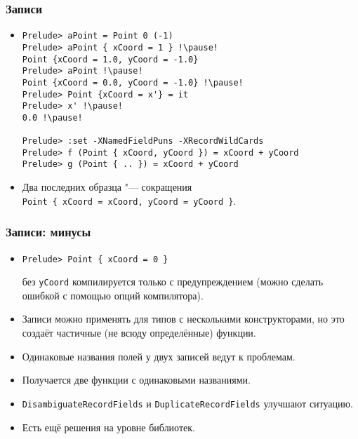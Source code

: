 \documentclass[10pt]{beamer}
\begin{document}
\begin{frame}[fragile]
\frametitle{Записи}\hypertarget{rec2}{}
\hyperlink{rec1}{}
\begin{itemize}
\item 
\begin{lstlisting}[basicstyle=\ttfamily\small]
Prelude> aPoint = Point 0 (-1)
Prelude> aPoint { xCoord = 1 } !\pause!
Point {xCoord = 1.0, yCoord = -1.0}
Prelude> aPoint !\pause!
Point {xCoord = 0.0, yCoord = -1.0} !\pause!
Prelude> Point {xCoord = x'} = it
Prelude> x' !\pause!
0.0 !\pause!

Prelude> :set -XNamedFieldPuns -XRecordWildCards
Prelude> f (Point { xCoord, yCoord }) = xCoord + yCoord
Prelude> g (Point { .. }) = xCoord + yCoord
\end{lstlisting}
\item Два последних образца "--- сокращения\\ \lstinline[basicstyle=\ttfamily\small]|Point { xCoord = xCoord, yCoord = yCoord }|.
\end{itemize}
\end{frame}

\begin{frame}[fragile]
\frametitle{Записи: минусы}\hypertarget{rec2}{}
\hyperlink{rec1}{}
\begin{itemize}
    \item
\begin{lstlisting}
Prelude> Point { xCoord = 0 }
\end{lstlisting}
    \pause
    без \lstinline|yCoord| компилируется только с предупреждением (можно сделать ошибкой с помощью опций компилятора).
    \pause 
    \item Записи можно применять для типов с несколькими конструкторами, но это создаёт частичные (не всюду определённые) функции.
    \pause
    \item Одинаковые названия полей у двух записей ведут к проблемам. 
    \pause
    \item Получается две функции с одинаковыми названиями.
    \item \lstinline|DisambiguateRecordFields| и \lstinline|DuplicateRecordFields| улучшают ситуацию.
    \pause
    \item Есть ещё решения на уровне библиотек.
\end{itemize}
\end{frame}
\end{document}
